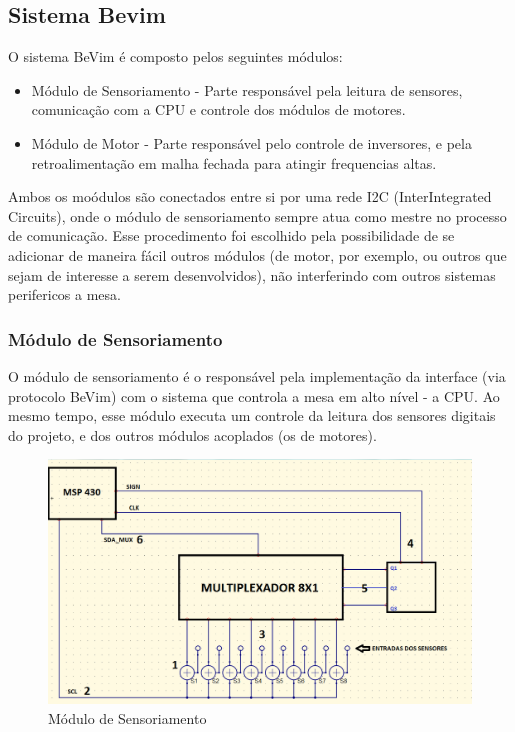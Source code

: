 \subsection{Sistema Bevim}

O sistema BeVim é composto pelos seguintes módulos:

\begin{itemize}
	\item Módulo de Sensoriamento - Parte responsável pela leitura de sensores, comunicação com a CPU e controle dos módulos de motores.
	\item Módulo de Motor - Parte responsável pelo controle de inversores, e pela retroalimentação em malha fechada para atingir frequencias altas.
\end{itemize}

Ambos os moódulos são conectados entre si por uma rede I2C (InterIntegrated Circuits), onde o módulo de sensoriamento sempre atua como mestre no processo de comunicação. Esse procedimento foi escolhido pela possibilidade de se adicionar de maneira fácil outros módulos (de motor, por exemplo, ou outros que sejam de interesse a serem desenvolvidos), não interferindo com outros sistemas perifericos a mesa.

\subsubsection{Módulo de Sensoriamento}
O módulo de sensoriamento é o responsável pela implementação da interface (via protocolo BeVim) com o sistema que controla a mesa em alto nível - a CPU. Ao mesmo tempo, esse módulo executa um controle da leitura dos sensores digitais do projeto, e dos outros módulos acoplados (os de motores).

\begin{figure}[htbp]
	\centering
		\includegraphics[scale=0.6]{figuras/mod_sensor.png}
	\caption{Módulo de Sensoriamento}
	\label{mod_sensor}
\end{figure}

